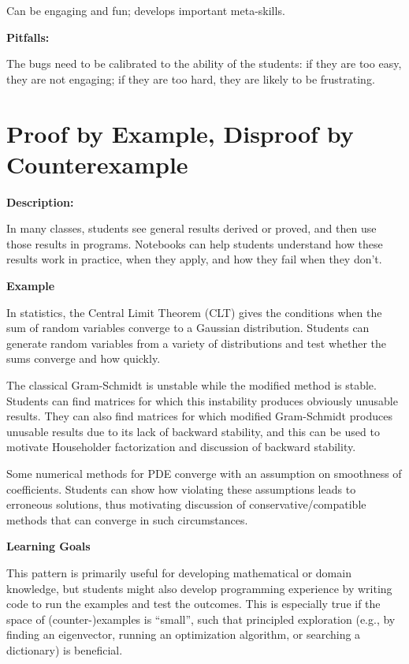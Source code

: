 \documentclass[]{book}
\begin{document}
Can be engaging and fun; develops important meta-skills.

\textbf{Pitfalls:}

The bugs need to be calibrated to the ability of the students: if they
are too easy, they are not engaging; if they are too hard, they are
likely to be frustrating.

\section{Proof by Example, Disproof by
Counterexample}\label{proof-by-example-disproof-by-counterexample}

\textbf{Description:}

In many classes, students see general results derived or proved, and
then use those results in programs. Notebooks can help students
understand how these results work in practice, when they apply, and how
they fail when they don't.

\textbf{Example}

In statistics, the Central Limit Theorem (CLT) gives the conditions when
the sum of random variables converge to a Gaussian distribution.
Students can generate random variables from a variety of distributions
and test whether the sums converge and how quickly.

The classical Gram-Schmidt is unstable while the modified method is
stable. Students can find matrices for which this instability produces
obviously unusable results. They can also find matrices for which
modified Gram-Schmidt produces unusable results due to its lack of
backward stability, and this can be used to motivate Householder
factorization and discussion of backward stability.

Some numerical methods for PDE converge with an assumption on smoothness
of coefficients. Students can show how violating these assumptions leads
to erroneous solutions, thus motivating discussion of
conservative/compatible methods that can converge in such circumstances.

\textbf{Learning Goals}

This pattern is primarily useful for developing mathematical or domain
knowledge, but students might also develop programming experience by
writing code to run the examples and test the outcomes. This is
especially true if the space of (counter-)examples is ``small'', such
that principled exploration (e.g., by finding an eigenvector, running an
optimization algorithm, or searching a dictionary) is beneficial.
\end{document}
